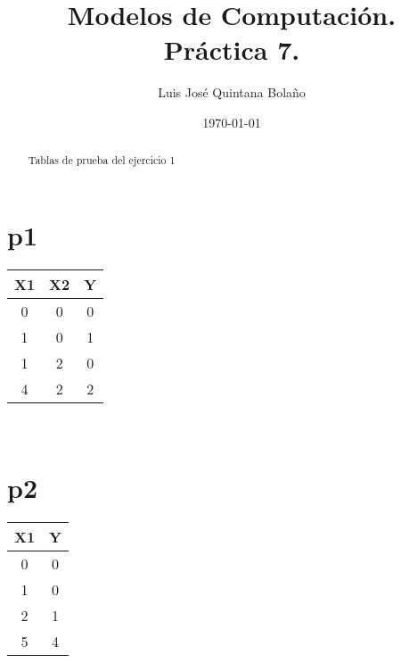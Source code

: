\documentclass[a4paper]{article}
\title{Modelos de Computación.\\ Práctica 7. }
\author{Luis José Quintana Bolaño}
\date{\today}
\begin{document}
	\maketitle
	\begin{abstract}
	    Tablas de prueba del ejercicio 1
  	\end{abstract}
	\section{p1}
		\begin{center}
		\begin{tabular}{|c|c|c|} 
  				X1 & X2 & Y \\ \hline
  				0 & 0 & 0 \\ \hline
			    1 & 0 & 1 \\ \hline
			    1 & 2 & 0 \\ \hline
			    4 & 2 & 2 \\ \hline
  		\end{tabular} \\
  		\end{center}
  	\section{p2}
  		\begin{center}
		\begin{tabular}{|c|c|} 
  				X1 & Y \\ \hline
  				0 & 0 \\ \hline
			    1 & 0  \\ \hline
			    2 & 1 \\ \hline
			    5 & 4 \\ \hline
  		\end{tabular} \\
  		\end{center}
\end{document}
